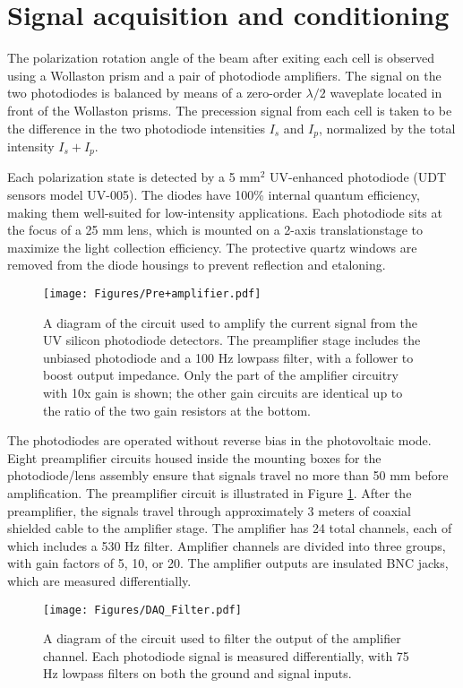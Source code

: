\documentclass [10pt, twoside] {uwthesis}[2012/04/02]
\begin{document}
\section{Signal acquisition and conditioning}
The polarization rotation angle of the beam after exiting each cell is observed using a Wollaston prism and a pair of photodiode amplifiers. The signal on the two photodiodes is balanced by means of a zero-order $\lambda/2$ waveplate located in front of the Wollaston prisms. The precession signal from each cell is taken to be the difference in the two photodiode intensities $I_s$ and $I_p$, normalized by the total intensity $I_s+I_p$. 

Each polarization state is detected by a 5 mm$^2$ UV-enhanced photodiode (UDT sensors model UV-005). The diodes have 100\% internal quantum efficiency, making them well-suited for low-intensity applications. Each photodiode sits at the focus of a 25 mm lens, which is mounted on a 2-axis translationstage to maximize the light collection efficiency. The protective quartz windows are removed from the diode housings to prevent reflection and etaloning. 
\begin{figure}
\begin{center}
\texttt{[image: Figures/Pre+amplifier.pdf]}
\end{center}
\caption[Photodiode amplifier circuit]{\narrower A diagram of the circuit used to amplify the current signal from the UV silicon photodiode detectors. The preamplifier stage includes the unbiased photodiode and a 100 Hz lowpass filter, with a follower to boost output impedance. Only the part of the amplifier circuitry with 10x gain is shown; the other gain circuits are identical up to the ratio of the two gain resistors at the bottom.}
\label{Amplifier_Diagram}
\end{figure}

The photodiodes are operated without reverse bias in the photovoltaic mode. Eight preamplifier circuits housed inside the mounting boxes for the photodiode/lens assembly ensure that signals travel no more than 50 mm before amplification. The preamplifier circuit is illustrated in Figure \ref{Amplifier_Diagram}. After the preamplifier, the signals travel through approximately 3 meters of coaxial shielded cable to the amplifier stage. The amplifier has 24 total channels, each of which includes a 530 Hz filter. Amplifier channels are divided into three groups, with gain factors of 5, 10, or 20. The amplifier outputs are insulated BNC jacks, which are measured differentially.
\begin{figure}
\begin{center}
\texttt{[image: Figures/DAQ\_Filter.pdf]}
\end{center}
\caption[Analog filter circuit]{\narrower A diagram of the circuit used to 
filter the output of the amplifier channel. Each photodiode signal is measured 
differentially, with 75 Hz lowpass filters on both the ground and signal 
inputs.}
\label{DAQ_Filter}
\end{figure}
\end{document}
